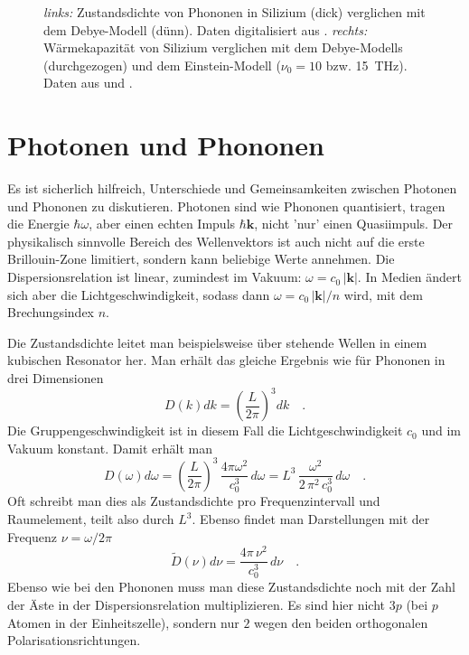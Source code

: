 \begin{figure}
  \caption{ \textit{links:} Zustandsdichte von Phononen in Silizium (dick) verglichen mit dem Debye-Modell (dünn). Daten digitalisiert aus \cite{dolling66_si}. \textit{rechts:} Wärmekapazität von Silizium verglichen mit dem Debye-Modells (durchgezogen) und dem Einstein-Modell ($\nu_0=10$ bzw. 15~THz). Daten aus \cite{Flubacher59_si} und \cite{Okhotin72_si}. \label{fig:wk_Si}}
\end{figure}



\section{Photonen und Phononen}

Es ist sicherlich hilfreich, Unterschiede und Gemeinsamkeiten zwischen  Photonen und Phononen zu diskutieren. Photonen sind wie Phononen quantisiert, tragen die Energie $\hbar \omega$, aber einen echten Impuls $\hbar \mathbf{k}$, nicht 'nur' einen Quasiimpuls. Der physikalisch sinnvolle Bereich des Wellenvektors ist auch nicht auf die erste Brillouin-Zone limitiert, sondern kann beliebige Werte annehmen. Die Dispersionsrelation ist linear, zumindest im Vakuum: $\omega = c_0 \, | \mathbf{k} |$. In Medien ändert sich aber die Lichtgeschwindigkeit, sodass dann $\omega = c_0 \, | \mathbf{k} | / n$ wird, mit dem Brechungsindex $n$.

Die Zustandsdichte leitet man beispielsweise über stehende Wellen in einem kubischen Resonator her. Man erhält das gleiche Ergebnis wie für Phononen in drei Dimensionen
\begin{equation}
D(k) dk = \left( \frac{L}{2 \pi} \right)^3  dk \quad .
\end{equation}
Die Gruppengeschwindigkeit ist in diesem Fall die Lichtgeschwindigkeit $c_0$ und im Vakuum konstant. Damit erhält man
\begin{equation}
D(\omega) d\omega = \left( \frac{L}{2 \pi} \right)^3 \, \frac{4 \pi \omega^2}{c_0^3} \, d\omega 
= L^3 \, \frac{\omega^2}{2 \, \pi^2 \, c_0^3} \, d\omega \quad .
\end{equation}
Oft schreibt man dies als Zustandsdichte pro Frequenzintervall und Raumelement, teilt also durch $L^3$. Ebenso findet man Darstellungen mit der Frequenz $\nu = \omega / 2 \pi$
\begin{equation}
\tilde{D}(\nu) d\nu 
= \frac{4 \pi \, \nu^2}{ c_0^3} \, d\nu \quad .
\end{equation}
Ebenso wie bei den Phononen muss man diese Zustandsdichte noch mit der Zahl der Äste in der Dispersionsrelation multiplizieren. Es sind hier nicht $3p$ (bei $p$ Atomen in der Einheitszelle), sondern nur $2$ wegen den beiden orthogonalen Polarisationsrichtungen.

